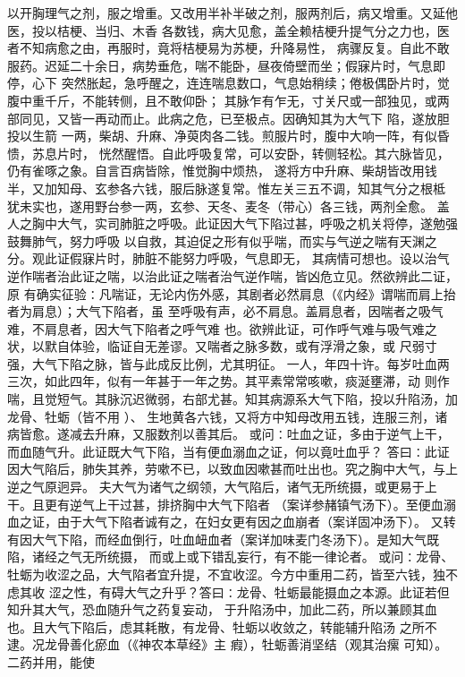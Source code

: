 \documentclass[a4paper,12pt,UTF8,twoside]{ctexbook}
\begin{document}
以开胸理气之剂，服之增重。又改用半补半破之剂，服两剂后，病又增重。又延他医，投以桔梗、当归、木香 
各数钱，病大见愈，盖全赖桔梗升提气分之力也，医者不知病愈之由，再服时，竟将桔梗易为苏梗，升降易性， 
病骤反复。自此不敢服药。迟延二十余日，病势垂危，喘不能卧，昼夜倚壁而坐；假寐片时，气息即停，心下 
突然胀起，急呼醒之，连连喘息数口，气息始稍续；倦极偶卧片时，觉腹中重千斤，不能转侧，且不敢仰卧； 
其脉乍有乍无，寸关尺或一部独见，或两部同见，又皆一再动而止。此病之危，已至极点。因确知其为大气下 
陷，遂放胆投以生箭 一两，柴胡、升麻、净萸肉各二钱。煎服片时，腹中大响一阵，有似昏愦，苏息片时， 
恍然醒悟。自此呼吸复常，可以安卧，转侧轻松。其六脉皆见，仍有雀啄之象。自言百病皆除，惟觉胸中烦热， 
遂将方中升麻、柴胡皆改用钱半，又加知母、玄参各六钱，服后脉遂复常。惟左关三五不调，知其气分之根柢 
犹未实也，遂用野台参一两，玄参、天冬、麦冬（带心）各三钱，两剂全愈。 
盖人之胸中大气，实司肺脏之呼吸。此证因大气下陷过甚，呼吸之机关将停，遂勉强鼓舞肺气，努力呼吸 
以自救，其迫促之形有似乎喘，而实与气逆之喘有天渊之分。观此证假寐片时，肺脏不能努力呼吸，气息即无， 
其病情可想也。设以治气逆作喘者治此证之喘，以治此证之喘者治气逆作喘，皆凶危立见。然欲辨此二证，原 
有确实征验∶凡喘证，无论内伤外感，其剧者必然肩息（《内经》谓喘而肩上抬者为肩息）；大气下陷者，虽 
至呼吸有声，必不肩息。盖肩息者，因喘者之吸气难，不肩息者，因大气下陷者之呼气难 
也。欲辨此证，可作呼气难与吸气难之状，以默自体验，临证自无差谬。又喘者之脉多数，或有浮滑之象，或 
尺弱寸强，大气下陷之脉，皆与此成反比例，尤其明征。 
一人，年四十许。每岁吐血两三次，如此四年，似有一年甚于一年之势。其平素常常咳嗽，痰涎壅滞，动 
则作喘，且觉短气。其脉沉迟微弱，右部尤甚。知其病源系大气下陷，投以升陷汤，加龙骨、牡蛎（皆不用 ）、 
生地黄各六钱，又将方中知母改用五钱，连服三剂，诸病皆愈。遂减去升麻，又服数剂以善其后。 
或问∶吐血之证，多由于逆气上干，而血随气升。此证既大气下陷，当有便血溺血之证，何以竟吐血乎？ 
答曰∶此证因大气陷后，肺失其养，劳嗽不已，以致血因嗽甚而吐出也。究之胸中大气，与上逆之气原迥异。 
夫大气为诸气之纲领，大气陷后，诸气无所统摄，或更易于上干。且更有逆气上干过甚，排挤胸中大气下陷者 
（案详参赭镇气汤下）。至便血溺血之证，由于大气下陷者诚有之，在妇女更有因之血崩者（案详固冲汤下）。 
又转有因大气下陷，而经血倒行，吐血衄血者（案详加味麦门冬汤下）。是知大气既陷，诸经之气无所统摄， 
而或上或下错乱妄行，有不能一律论者。 
或问∶龙骨、牡蛎为收涩之品，大气陷者宜升提，不宜收涩。今方中重用二药，皆至六钱，独不虑其收 
涩之性，有碍大气之升乎？答曰∶龙骨、牡蛎最能摄血之本源。此证若但知升其大气，恐血随升气之药复妄动， 
于升陷汤中，加此二药，所以兼顾其血也。且大气下陷后，虑其耗散，有龙骨、牡蛎以收敛之，转能辅升陷汤 
之所不逮。况龙骨善化瘀血（《神农本草经》主 瘕），牡蛎善消坚结（观其治瘰 可知）。二药并用，能使 
\end{document}
